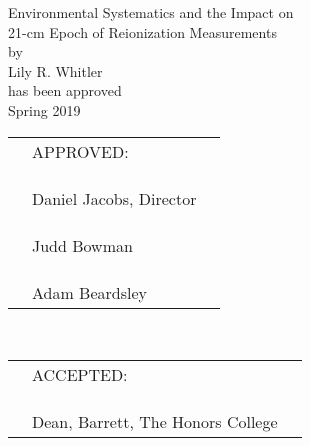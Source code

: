 \documentclass[12pt]{article}
\begin{document}
\doublespacing
\begin{center}
Environmental Systematics and the Impact on \\ 21-cm Epoch of Reionization Measurements \\
by \\
Lily R. Whitler \\
has been approved \\
Spring 2019 \vspace{0.1\textheight}

\begingroup
\renewcommand{\arraystretch}{0.7}
\begin{tabular}{p{1cm}p{3.5in}p{1cm}}
	& \centering APPROVED: & \\
	& & \\ & & \\
	& \hrulefill & \\
	& \hfill Daniel Jacobs, Director & \\
	& & \\ & & \\
	& \hrulefill & \\
	& \hfill Judd Bowman & \\
	& & \\ & & \\
	& \hrulefill & \\
	& \hfill Adam Beardsley &
\end{tabular} \vspace{0.075\textheight} \\
\begin{tabular}{p{1cm}p{3.5in}p{1cm}}
	& \centering ACCEPTED: & \\
	& & \\ & & \\
	& \hrulefill & \\
	& \hfill Dean, Barrett, The Honors College &
\end{tabular}
\endgroup
\end{center}
\thispagestyle{empty}
\newpage
{}
\end{document}
